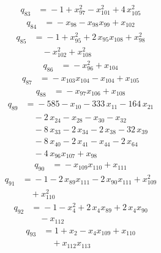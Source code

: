 \documentclass[11pt]{article}
\theoremstyle{remark}\newtheorem{remark}[theorem]{Remark}
\begin{document}
\begin{align*}
q_{83} &={}-1 +x_{97}^{2} -x_{101}^{2} +4\,x_{105}^{2}
\end{align*}
\begin{align*}
q_{84} &={}-x_{98} -x_{98}x_{99} +x_{102}
\end{align*}
\begin{align*}
q_{85} &={}-1 +x_{95}^{2} +2\,x_{95}x_{108} +x_{98}^{2}\\
&\quad -x_{102}^{2} +x_{108}^{2}
\end{align*}
\begin{align*}
q_{86} &={}-x_{96}^{2} +x_{104}
\end{align*}
\begin{align*}
q_{87} &={}-x_{103}x_{104} -x_{104} +x_{105}
\end{align*}
\begin{align*}
q_{88} &={}-x_{97}x_{106} +x_{108}
\end{align*}
\begin{align*}
q_{89} &={}-585 -x_{10} -333\,x_{11} -164\,x_{21}\\
&\quad -2\,x_{24} -x_{28} -x_{30} -x_{32}\\
&\quad -8\,x_{33} -2\,x_{34} -2\,x_{38} -32\,x_{39}\\
&\quad -8\,x_{40} -2\,x_{41} -x_{44} -2\,x_{64}\\
&\quad -4\,x_{96}x_{107} +x_{98}
\end{align*}
\begin{align*}
q_{90} &={}-x_{109}x_{110} +x_{111}
\end{align*}
\begin{align*}
q_{91} &={}-1 -2\,x_{89}x_{111} -2\,x_{90}x_{111} +x_{109}^{2}\\
&\quad +x_{110}^{2}
\end{align*}
\begin{align*}
q_{92} &={}-1 -x_{4}^{2} +2\,x_{4}x_{89} +2\,x_{4}x_{90}\\
&\quad -x_{112}
\end{align*}
\begin{align*}
q_{93} &={}1 +x_{2} -x_{4}x_{109} +x_{110}\\
&\quad +x_{112}x_{113}
\end{align*}
\end{document}

